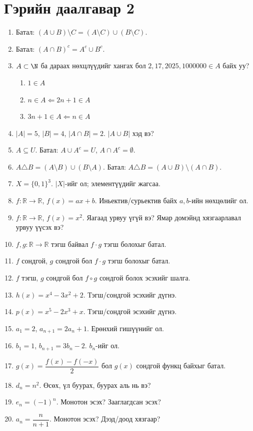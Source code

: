 \section*{Гэрийн даалгавар 2 }
\begin{enumerate}
  \item Батал: $(A\cup B)\setminus C=(A\setminus C)\cup(B\setminus C)$.
  \item Батал: $(A\cap B)^c=A^c\cup B^c$.
  \item $A\subset \N$ ба дараах нөхцлүүдийг хангах бол $2, 17, 2025, 1000000\in A$ байх уу?
  \begin{enumerate}
      \item $1\in A$
      \item $n\in A\Leftarrow 2n+1\in A$
      \item $3n+1\in A\Leftarrow n\in A$
  \end{enumerate}
  \item $|A|=5$, $|B|=4$, $|A\cap B|=2$. $|A\cup B|$ хэд вэ?
  \item $A\subseteq U$. Батал: $A\cup A^c=U$, $A\cap A^c=\emptyset$.
  \item $A\triangle B=(A\setminus B)\cup(B\setminus A)$. Батал: $A\triangle B=(A\cup B)\setminus(A\cap B)$.
  \item $X=\{0,1\}^3$. $|X|$-ийг ол; элементүүдийг жагсаа.
  \item $f:\mathbb{R}\to\mathbb{R}$, $f(x)=ax+b$. Иньектив/сурьектив байх $a,b$-ийн нөхцөлийг ол.
  \item $f:\mathbb{R}\to\mathbb{R}$, $f(x)=x^2$. Яагаад урвуу үгүй вэ? Ямар домэйнд хязгаарлавал урвуу үүсэх вэ?
  \item $f,g:\mathbb{R}\to\mathbb{R}$ тэгш байвал $f\cdot g$ тэгш болохыг батал.
  \item $f$ сондгой, $g$ сондгой бол $f\cdot g$ тэгш болохыг батал.
  \item $f$ тэгш, $g$ сондгой бол $f\circ g$ сондгой болох эсэхийг шалга.
  \item $h(x)=x^4-3x^2+2$. Тэгш/сондгой эсэхийг дүгнэ.
  \item $p(x)=x^5-2x^3+x$. Тэгш/сондгой эсэхийг дүгнэ.
  \item $a_1=2$, $a_{n+1}=2a_n+1$. Ерөнхий гишүүнийг ол.
  \item $b_1=1$, $b_{n+1}=3b_n-2$. $b_n$-ийг ол.
  \item $g(x)=\dfrac{f(x)-f(-x)}{2}$ бол $g(x)$ сондгой функц байхыг батал.
  \item $d_n=n^2$. Өсөх, үл буурах, буурах аль нь вэ?
  \item $e_n=(-1)^n$. Монотон эсэх? Зааглагдсан эсэх?
  \item $a_n=\dfrac{n}{n+1}$. Монотон эсэх? Дээд/доод хязгаар?
\end{enumerate}
\newpage
